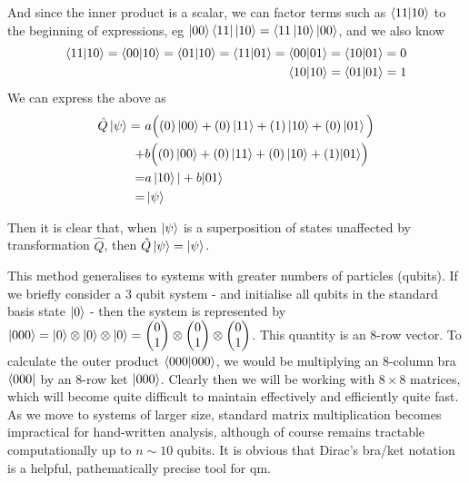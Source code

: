 \begin{example}
    And since the inner product is a scalar, we can factor terms such as $\braket{11|10}$ to the beginning of expressions, eg $ \ket{00} \bra{11} \ket{10} = \langle 11\ket{10} \ket{00}$, and we also know
    \begin{equation}
        \begin{split}
        \braket{11|10} = \braket{00|10} =  \braket{01|10} = \braket{11|01} = \braket{00|01}  = \braket{10|01} = 0 
        \\ \braket{10|10} = \braket{01|01} = 1 
        \end{split}
    \end{equation}
    We can express the above as 
    \begin{equation}
        \begin{split}
            \hat{Q}\ket{\psi} = 
            \ &a \Big((0) \ket{00}  + (0) \ket{11} + (1) \ket{10}  + (0) \ket{01} \Big)
            \\ + &b \Big((0)\ket{00} +(0) \ket{11}+ (0) \ket{10} + (1) |01 \rangle \Big)
            \\ = &a\ket{10}| + b |01 \rangle 
            \\ = &\ket{\psi} 
        \end{split}
    \end{equation}
    
    Then it is clear that, when $\ket{\psi}$ is a superposition of states unaffected by transformation $\hat{Q}$, then $\hat{Q}\ket{\psi} = \ket{\psi} $. 
\end{example}
\par 

This method generalises to systems with greater numbers of particles (qubits). 
If we briefly consider a 3 qubit system - and initialise all qubits in the standard basis state $\ket{0}$ 
- then the system is represented by $|000\rangle = \ket{0} \otimes \ket{0} \otimes \ket{0} = \left(\begin{matrix}0\\1\end{matrix}\right) \otimes \left(\begin{matrix}0\\1\end{matrix}\right) \otimes \left(\begin{matrix}0\\1\end{matrix}\right)$. 
This quantity is an 8-row vector.  To calculate the outer product $\langle 000 | 000 \rangle$, we would be multiplying an 8-column bra $\langle000| $ by an 8-row ket $|000\rangle$. 
Clearly then we will be working with $8 \times 8$ matrices, which will become quite difficult to maintain effectively and efficiently quite fast. 
As we move to systems of larger size, standard matrix multiplication becomes impractical for hand-written analysis, 
    although of course remains tractable computationally up to $n\sim 10$ qubits. 
It is obvious that Dirac's bra/ket notation is a helpful, pathematically precise tool for \gls{qm}. 